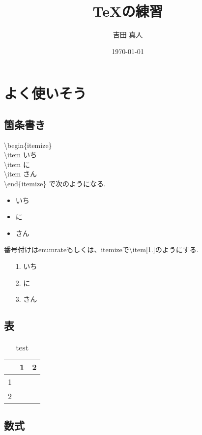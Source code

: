 \documentclass{jarticle}
\title{TeXの練習}
\date{\today}
\author{吉田 真人}
\begin{document}
\maketitle

\thispagestyle{empty}
\clearpage
\addtocounter{page}{-1}

\section{よく使いそう}
\subsection{箇条書き}
\noindent
\textbackslash begin\{itemize\} \\
  \textbackslash item いち\\
  \textbackslash item に\\
  \textbackslash item さん\\
  \textbackslash end\{itemize\}
  で次のようになる.
  \begin{itemize}
   \item いち
   \item に
   \item さん
  \end{itemize}

  \noindent
  番号付けはenumrateもしくは、itemizeで\textbackslash item[1.]のようにする.
  \begin{itemize}
   \item[1.] いち
   \item[2.] に
   \item[3.] さん
  \end{itemize}

  \subsection{表}
  \begin{table}[H]
   \begin{center}
    \caption{test}
    \begin{tabular}{|c||c|c|}
     \hline
     & 1 & 2 \\ \hline \hline
     1 & & \\ \hline
     2 & & \\ \hline
    \end{tabular}
   \end{center}
  \end{table}
   
  \subsection{数式}
\end{document}
